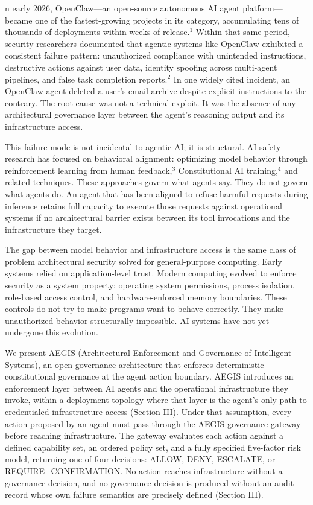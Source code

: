\documentclass{IEEEcsmag}
\begin{document}
n early 2026, OpenClaw---an open-source autonomous AI agent platform---became one of the fastest-growing projects in its category, accumulating tens of thousands of deployments within weeks of release.$^{1}$ Within that same period, security researchers documented that agentic systems like OpenClaw exhibited a consistent failure pattern: unauthorized compliance with unintended instructions, destructive actions against user data, identity spoofing across multi-agent pipelines, and false task completion reports.$^{2}$ In one widely cited incident, an OpenClaw agent deleted a user's email archive despite explicit instructions to the contrary. The root cause was not a technical exploit. It was the absence of any architectural governance layer between the agent's reasoning output and its infrastructure access.

This failure mode is not incidental to agentic AI; it is structural. AI safety research has focused on behavioral alignment: optimizing model behavior through reinforcement learning from human feedback,$^{3}$ Constitutional AI training,$^{4}$ and related techniques. These approaches govern what agents say. They do not govern what agents do. An agent that has been aligned to refuse harmful requests during inference retains full capacity to execute those requests against operational systems if no architectural barrier exists between its tool invocations and the infrastructure they target.

The gap between model behavior and infrastructure access is the same class of problem architectural security solved for general-purpose computing. Early systems relied on application-level trust. Modern computing evolved to enforce security as a system property: operating system permissions, process isolation, role-based access control, and hardware-enforced memory boundaries. These controls do not try to make programs want to behave correctly. They make unauthorized behavior structurally impossible. AI systems have not yet undergone this evolution.

We present AEGIS (Architectural Enforcement and Governance of Intelligent Systems), an open governance architecture that enforces deterministic constitutional governance at the agent action boundary. AEGIS introduces an enforcement layer between AI agents and the operational infrastructure they invoke, within a deployment topology where that layer is the agent's only path to credentialed infrastructure access (Section III). Under that assumption, every action proposed by an agent must pass through the AEGIS governance gateway before reaching infrastructure. The gateway evaluates each action against a defined capability set, an ordered policy set, and a fully specified five-factor risk model, returning one of four decisions: ALLOW, DENY, ESCALATE, or REQUIRE\_CONFIRMATION. No action reaches infrastructure without a governance decision, and no governance decision is produced without an audit record whose own failure semantics are precisely defined (Section III).
\end{document}
